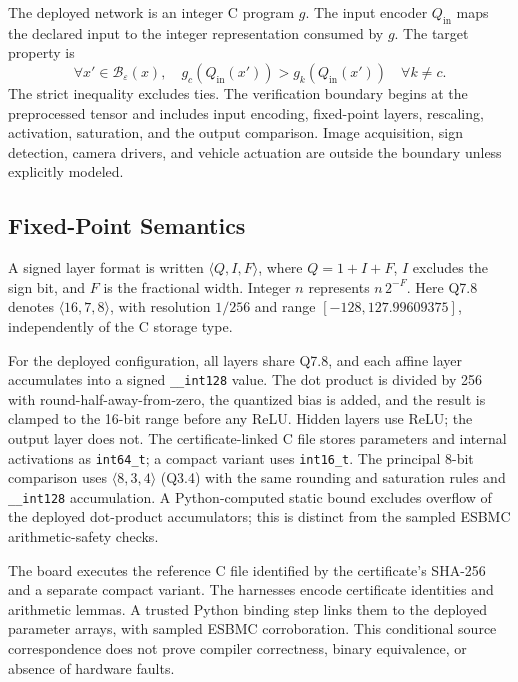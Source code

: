 The deployed network is an integer C program $g$. The input encoder $Q_{\mathrm{in}}$ maps the declared input to the integer representation consumed by $g$. The target property is
\begin{equation}
\forall x'\in\mathcal{B}_{\varepsilon}(x),\quad g_c(Q_{\mathrm{in}}(x'))>g_k(Q_{\mathrm{in}}(x'))\quad\forall k\neq c.
\label{eq:robustness}
\end{equation}
The strict inequality excludes ties. The verification boundary begins at the preprocessed tensor and includes input encoding, fixed-point layers, rescaling, activation, saturation, and the output comparison. Image acquisition, sign detection, camera drivers, and vehicle actuation are outside the boundary unless explicitly modeled.

\subsection{Fixed-Point Semantics}
\label{sec:synthesis}


A signed layer format is written $\langle Q,I,F\rangle$, where $Q=1+I+F$, $I$ excludes the sign bit, and $F$ is the fractional width. Integer $n$ represents $n\,2^{-F}$. Here Q7.8 denotes $\langle16,7,8\rangle$, with resolution $1/256$ and range $[-128,127.99609375]$, independently of the C storage type.

For the deployed configuration, all layers share Q7.8, and each affine layer accumulates into a signed \texttt{\_\_int128} value. The dot product is divided by 256 with round-half-away-from-zero, the quantized bias is added, and the result is clamped to the 16-bit range before any ReLU. Hidden layers use ReLU; the output layer does not. The certificate-linked C file stores parameters and internal activations as \texttt{int64\_t}; a compact variant uses \texttt{int16\_t}. The principal 8-bit comparison uses $\langle8,3,4\rangle$ (Q3.4) with the same rounding and saturation rules and \texttt{\_\_int128} accumulation. A Python-computed static bound excludes overflow of the deployed dot-product accumulators; this is distinct from the sampled ESBMC arithmetic-safety checks.

The board executes the reference C file identified by the certificate's SHA-256 and a separate compact variant. The harnesses encode certificate identities and arithmetic lemmas. A trusted Python binding step links them to the deployed parameter arrays, with sampled ESBMC corroboration. This conditional source correspondence does not prove compiler correctness, binary equivalence, or absence of hardware faults.



